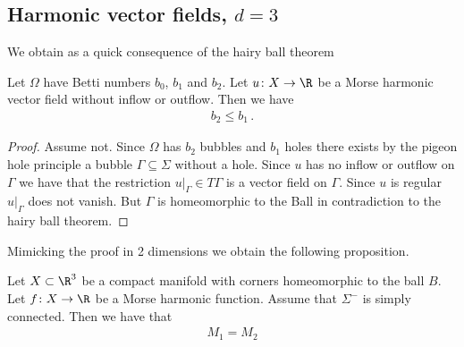 \subsection{Harmonic vector fields, $d=3$}
We obtain as a quick consequence of the hairy ball theorem
\begin{proposition}
  Let $\Omega$ have Betti numbers $b_0$, $b_1$ and $b_2$.
  Let $u\colon X\to\R$
  be a Morse harmonic vector field without inflow or outflow. Then we have
  \begin{align*}
    b_2\leq b_1\,.
  \end{align*}
\end{proposition}
\begin{proof} 
  Assume not. Since $\Omega$ has $b_2$ bubbles and $b_1$ holes there exists by the pigeon hole
  principle a bubble $\Gamma\subseteq\Sigma$ without a hole. Since $u$ has no inflow or outflow on $\Gamma$ we
  have that the restriction $u\vert_\Gamma\in T\Gamma$ is a vector field on $\Gamma$. Since $u$ is regular
  $u\vert_\Gamma$ does not vanish. But $\Gamma$ is homeomorphic to the Ball in contradiction to the hairy ball theorem.
\end{proof}
Mimicking the proof in 2 dimensions we obtain the following proposition.
\begin{proposition}
  Let $X\subset\R^3$ be a compact manifold with corners homeomorphic to the ball $B$.
  Let $f\colon X\to\R$ be a Morse harmonic function. Assume that $\Sigma^-$ is simply connected.
  Then we have that
  \begin{align*}
    M_1=M_2
  \end{align*}
\end{proposition}
